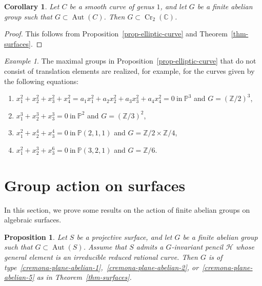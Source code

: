 \documentclass[11pt]{amsart}
\numberwithin{equation}{section}
\newtheorem{proposition}[thm]{Proposition}
\newtheorem{corollary}[thm]{Corollary}
\theoremstyle{definition}
\theoremstyle{remark}
\newtheorem{example}[thm]{Example}
\DeclareMathOperator{\Cr}{Cr}
\DeclareMathOperator{\Aut}{Aut}
\begin{document}
\begin{corollary}
\label{cor-elliptic-type}
Let $C$ be a smooth curve of genus $1$, and let $G$ be a finite abelian group such that $G\subset \Aut(C)$. 
Then $G\subset \Cr_2(\mathbb{C})$.
\end{corollary}

\begin{proof}
  This follows from Proposition~\ref{prop-elliptic-curve} and Theorem~\ref{thm-surfaces}.
\end{proof}

\begin{example}
The maximal groups in Proposition~\ref{prop-elliptic-curve} that do not consist of translation elements are realized, for example, for the curves given by the following equations:
\begin{enumerate}\setlength{\itemsep}{2pt}
\item
$x_1^2+x_2^2+x_3^2+x_4^2=a_1x_1^2+a_2x_2^2+a_3x_3^2+a_4x_4^2=0\ \text{in}\ \mathbb{P}^3$ and $G=(\mathbb{Z}/2)^3$, 
\item
$x_1^3+x_2^3+x_3^3=0\ \text{in}\ \mathbb{P}^2$ and $G=(\mathbb{Z}/3)^2$, 
\item
$x_1^2+x_2^4+x_3^4=0\ \text{in}\  \mathbb{P}(2,1,1)$ and $G=\mathbb{Z}/2\times\mathbb{Z}/4$, 
\item
$x_1^2+x_2^3+x_3^6=0\ \text{in}\ \mathbb{P}(3,2,1)$ and $G=\mathbb{Z}/6$.
\end{enumerate}
\end{example}

\section{Group action on surfaces}
\label{sec-group-action-on-surfaces}
In this section, we prove some results on the action of finite abelian groups on algebraic surfaces.

\begin{proposition}
\label{prop-invariant-pencil}
Let $S$ be a projective surface, and let $G$ be a finite abelian group such that $G\subset \Aut(S)$. 
Assume that $S$ admits a $G$-invariant pencil $\mathcal{H}$ whose general element is an irreducible reduced rational curve. Then $G$ is of type~\eqref{cremona-plane-abelian-1},~\eqref{cremona-plane-abelian-2}, or~\eqref{cremona-plane-abelian-5} as in Theorem~\ref{thm-surfaces}.
\end{proposition} 
\end{document}
